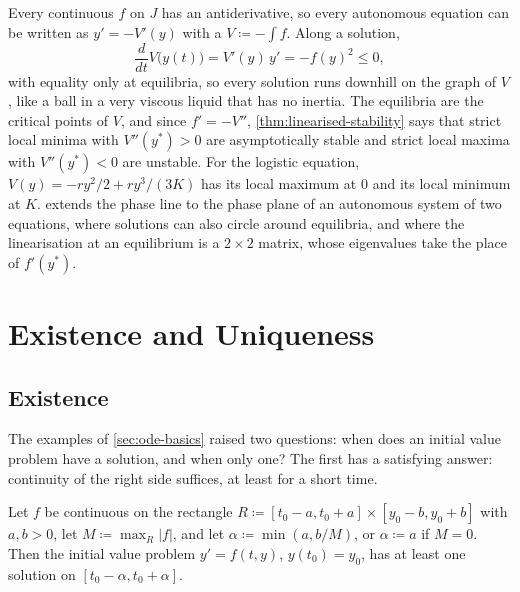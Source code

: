 Every continuous $f$ on $J$ has an antiderivative, so every autonomous equation can be written as $y'=-V'(y)$ with a  $V\coloneqq-\int f$. Along a solution,
\[
\frac d{dt}V\bigl(y(t)\bigr)=V'(y)\,y'=-f(y)^2\le0 ,
\]
with equality only at equilibria, so every solution runs downhill on the graph of $V$, like a ball in a very viscous liquid that has no inertia. The equilibria are the critical points of $V$, and since $f'=-V''$, \cref{thm:linearised-stability} says that strict local minima with $V''(y^*)>0$ are asymptotically stable and strict local maxima with $V''(y^*)<0$ are unstable. For the logistic equation, $V(y)=-ry^2/2+ry^3/(3K)$ has its local maximum at $0$ and its local minimum at $K$.  extends the phase line to the phase plane of an autonomous system of two equations, where solutions can also circle around equilibria, and where the linearisation at an equilibrium is a $2\times2$ matrix, whose eigenvalues take the place of $f'(y^*)$.

\section{Existence and Uniqueness}
\label{sec:existence-uniqueness}

\subsection{Existence}

The examples of \cref{sec:ode-basics} raised two questions: when does an initial value problem have a solution, and when only one? The first has a satisfying answer: continuity of the right side suffices, at least for a short time.

\begin{theorem}
\label{thm:peano}
Let $f$ be continuous on the rectangle $R\coloneqq[t_0-a,t_0+a]\times[y_0-b,y_0+b]$ with $a,b>0$, let $M\coloneqq\max_R|f|$, and let $\alpha\coloneqq\min(a,b/M)$, or $\alpha\coloneqq a$ if $M=0$. Then the initial value problem $y'=f(t,y)$, $y(t_0)=y_0$, has at least one solution on $[t_0-\alpha,t_0+\alpha]$.
\end{theorem}

